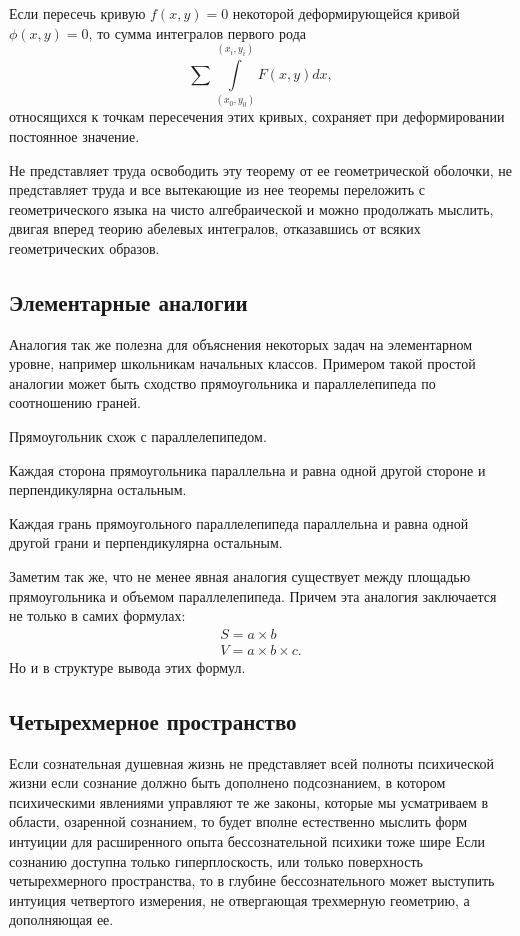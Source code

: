 \begin{theorem}
Если пересечь кривую $f(x,y)=0$ некоторой деформирующейся кривой $\phi(x,y) =
0$, то сумма интегралов первого рода
\begin{equation}
  \sum\int\limits_{(x_0, y_0)}^{(x_i, y_i)} F(x,y)dx,
\end{equation}
относящихся к точкам пересечения этих кривых, сохраняет при деформировании
постоянное значение.
\end{theorem}

Не представляет труда освободить эту теорему от ее геометрической оболочки,
не представляет труда и все вытекающие из нее теоремы переложить с
геометрического языка на чисто алгебраической и можно продолжать мыслить,
двигая вперед теорию абелевых интегралов, отказавшись от всяких
геометрических образов. 

\subsection{Элементарные аналогии}

Аналогия так же полезна для объяснения некоторых задач на элементарном уровне,
например школьникам начальных классов. Примером такой простой аналогии может
быть сходство прямоугольника и параллелепипеда по соотношению граней.

\begin{displayquote}
  Прямоугольник схож с параллелепипедом.

  Каждая сторона прямоугольника параллельна и равна одной другой стороне и
  перпендикулярна остальным.

  Каждая грань прямоугольного параллелепипеда параллельна и равна одной другой
  грани и перпендикулярна остальным.
\end{displayquote}

Заметим так же, что не менее явная аналогия существует между площадью
прямоугольника и объемом параллелепипеда. Причем эта аналогия заключается не
только в самих формулах:
\begin{gather}
  S = a \times b
  \\
  V = a \times b \times c.
\end{gather}
Но и в структуре вывода этих формул.

\subsection{Четырехмерное пространство}

Если сознательная душевная жизнь не представляет всей полноты психической
жизни если сознание должно быть дополнено подсознанием, в котором психическими
явлениями управляют те же законы, которые мы усматриваем в области, озаренной
сознанием, то будет вполне естественно мыслить форм интуиции для расширенного
опыта бессознательной психики тоже шире Если сознанию доступна только
гиперплоскость, или только поверхность четырехмерного пространства, то в глубине
бессознательного может выступить интуиция четвертого измерения, не отвергающая
трехмерную геометрию, а дополняющая ее. 

